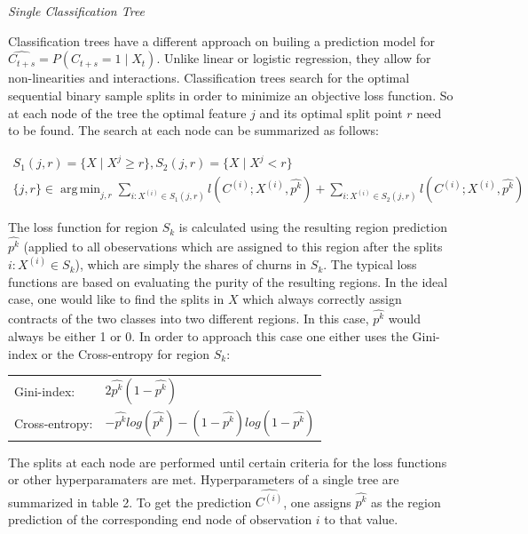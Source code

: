 \documentclass[12pt,titlepage]{article}
\DeclareMathOperator*{\argmin}{arg\,min}
\begin{document}
\textit{Single Classification Tree}

Classification trees have a different approach on builing a prediction model for $\widehat{C_{t+s}} = P(C_{t+s}=1\mid X_{t})$. Unlike linear or logistic regression, they allow for non-linearities and interactions. Classification trees search for the optimal sequential binary sample splits in order to minimize an objective loss function. So at each node of the tree the optimal feature $j$ and its optimal split point $r$ need to be found. The search at each node can be summarized as follows:

\begin{equation} \label{dec_tree}
    \begin{aligned}
        S_{1}(j, r) = \{X\mid X^{j}\geq r\} , S_{2}(j, r) = \{X\mid X^{j}< r\} \\
        \{j, r\} \in \argmin_{j, r} \sum_{i:X^{(i)}\in S_{1}(j, r)}l(C^{(i)}; X^{(i)}, \widehat{p^{k}}) + \sum_{i:X^{(i)}\in S_{2}(j, r)}l(C^{(i)}; X^{(i)}, \widehat{p^{k}})
    \end{aligned}
\end{equation}

The loss function for region $S_{k}$ is calculated using the resulting region prediction $\hat{p^{k}}$ (applied to all obeservations which are assigned to this region after the splits $i:X^{(i)}\in S_{k}$), which are simply the shares of churns in $S_{k}$. The typical loss functions are based on evaluating the purity of the resulting regions. In the ideal case, one would like to find the splits in $X$ which always correctly assign contracts of the two classes into two different regions. In this case, $\hat{p^{k}}$ would always be either 1 or 0. In order to approach this case one either uses the Gini-index or the Cross-entropy for region $S_{k}$: \\

\begin{center}
    \begin{tabular}{ll}
        Gini-index: & $2\widehat{p^{k}}(1-\widehat{p^{k}})$ \\
        Cross-entropy: & $-\widehat{p^{k}}log(\widehat{p^{k}}) - (1-\widehat{p^{k}})log(1-\widehat{p^{k}})$ \\
    \end{tabular}
\end{center}

The splits at each node are performed until certain criteria for the loss functions or other hyperparamaters are met. Hyperparameters of a single tree are summarized in table 2. To get the prediction $\hat{C^{(i)}}$, one assigns $\hat{p^{k}}$ as the region prediction of the corresponding end node of observation $i$ to that value. \\
\end{document}
